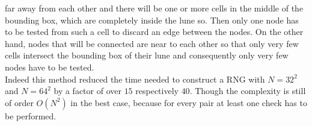     far away from each other and there will be one or more cells in the
    middle of the bounding box, which are completely inside the lune so.
    Then only one node has to be tested from such a cell to discard an
    edge between the nodes. On the other hand, nodes that will be connected
    are near to each other so that only very few cells intersect the bounding
    box of their lune and consequently only very few nodes have to be tested.\\
    Indeed this method reduced the time needed to construct a RNG with
    \(N=32^2\) and \(N=64^2\) by a factor of
    over \(15\) respectively \(40\). Though the complexity is still of
    order \(O(N^2)\) in the best case, because for every pair at least
    one check has to be performed.
